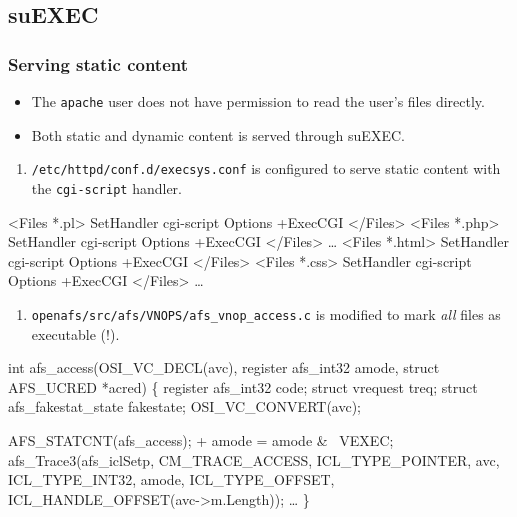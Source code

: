 \subsection{suEXEC}

\begin{frame}
  \frametitle{Serving static content}
  \begin{itemize}
  \item The \texttt{apache} user does not have permission to read the
    user's files directly.
  \item Both static and dynamic content is served through suEXEC.
  \end{itemize}
\end{frame}

\begin{frame}[fragile,t]
  \begin{enumerate}
  \item \texttt{/etc/httpd/conf.d/execsys.conf} is configured to serve
    static content with the \texttt{cgi-script} handler.
  \end{enumerate}
\begin{footnotesize}
\begin{semiverbatim}
<Files *.pl>
        SetHandler cgi-script
        Options +ExecCGI
</Files>
<Files *.php>
        SetHandler cgi-script
        Options +ExecCGI
</Files>
\ldots
<Files *.html>
        SetHandler cgi-script
        Options +ExecCGI
</Files>
<Files *.css>
        SetHandler cgi-script
        Options +ExecCGI
</Files>
\ldots
\end{semiverbatim}
\end{footnotesize}
\end{frame}

\begin{frame}[fragile,t]
  \begin{enumerate}
    \addtocounter{enumi}{1}
  \item \texttt{openafs/src/afs/VNOPS/afs\_vnop\_access.c} is modified
    to mark \emph{all} files as executable (!).
  \end{enumerate}
\begin{footnotesize}
\begin{semiverbatim}
 int
 afs_access(OSI_VC_DECL(avc), register afs_int32 amode,
            struct AFS_UCRED *acred)
 \{
     register afs_int32 code;
     struct vrequest treq;
     struct afs_fakestat_state fakestate;
     OSI_VC_CONVERT(avc);
 
     AFS_STATCNT(afs_access);
+    amode = amode & ~VEXEC;
     afs_Trace3(afs_iclSetp, CM_TRACE_ACCESS, ICL_TYPE_POINTER, avc,
                ICL_TYPE_INT32, amode, ICL_TYPE_OFFSET,
                ICL_HANDLE_OFFSET(avc->m.Length));
     \ldots
 \}
\end{semiverbatim}
\end{footnotesize}
\end{frame}

